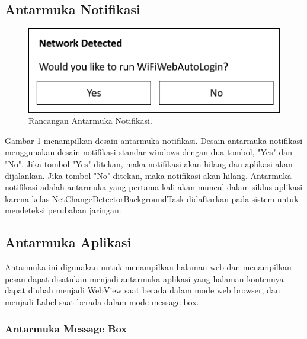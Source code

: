 \subsection{Antarmuka Notifikasi}
\label{subsec:antarmuka_notifikasi}

\begin{figure}[!htb]
    \centering
    \includegraphics[scale=0.5]{Gambar/UI_Notification.png}
    \caption[Rancangan Antarmuka Notifikasi.]{Rancangan Antarmuka Notifikasi.}
    \label{fig:RancanganAntarmukaNotifikasi}
\end{figure}

Gambar \ref{fig:RancanganAntarmukaNotifikasi} menampilkan desain antarmuka notifikasi. Desain antarmuka notifikasi menggunakan desain notifikasi standar windows dengan dua tombol, "Yes" dan "No". Jika tombol "Yes" ditekan, maka notifikasi akan hilang dan aplikasi akan dijalankan. Jika tombol "No" ditekan, maka notifikasi akan hilang. Antarmuka notifikasi adalah antarmuka yang pertama kali akan muncul dalam siklus aplikasi karena kelas NetChangeDetectorBackgroundTask didaftarkan pada sistem untuk mendeteksi perubahan jaringan.

\subsection{Antarmuka Aplikasi}
\label{subsec:antarmuka_aplikasi}

Antarmuka ini digunakan untuk menampilkan halaman web dan menampilkan pesan dapat disatukan menjadi antarmuka aplikasi yang halaman kontennya dapat diubah menjadi WebView saat berada dalam mode web browser, dan menjadi Label saat berada dalam mode message box.

\subsubsection{Antarmuka Message Box}
\label{subsec:antarmuka_message_box}

